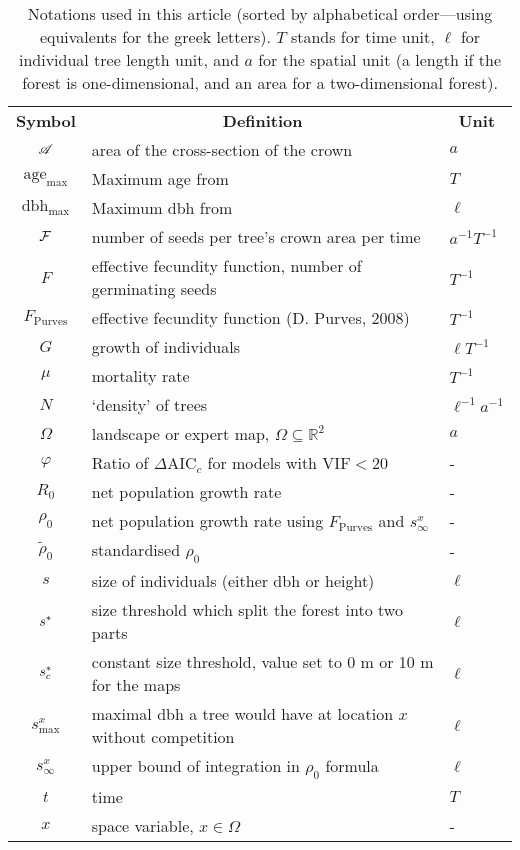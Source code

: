 \begin{table}[h]
	\centering
	\caption{Notations used in this article (sorted by alphabetical order---using equivalents for the greek letters). $ T $ stands for time unit, $ \ell $ for individual tree length unit, and $ a $ for the spatial unit (a length if the forest is one-dimensional, and an area for a two-dimensional forest).} \label{tab::notations}
	\begin{tabular}{@{}cll@{}}
		\toprule
		\textbf{Symbol} & \multicolumn{1}{c}{\textbf{Definition}} & \multicolumn{1}{c}{\textbf{Unit}} \\
		$ \mathscr{A} $ & area of the cross-section of the crown &  $ a $ \\
		$ \text{age}_{\max} $ & Maximum age from \citet{Burns1990, Burns1990a} & $ T $ \\
		$ \text{dbh}_{\max} $ & Maximum dbh from \citet{Burns1990, Burns1990a} & $ \ell $ \\
		$ \mathcal{F} $ & number of seeds per tree's crown area per time & $ a^{-1} T^{-1} $ \\
		$ F $ & effective fecundity function, \ie number of germinating seeds & $ T^{-1} $ \\
		$ F_{\text{Purves}} $ & effective fecundity function (D. Purves, 2008) & $ T^{-1} $ \\
		$ G $ & growth of individuals & $ \ell T^{-1} $ \\
		$ \mu $ & mortality rate & $ T^{-1} $ \\
		$ N $ & `density' of trees & $ \ell^{-1} a^{-1} $ \\
		$ \Omega $ & landscape or expert map, $ \Omega \subseteq \mathds{R}^2 $ & $ a $ \\
		$ \varphi $ & Ratio of $ \Delta \text{AIC}_c $ for models with $ \text{VIF} < 20 $ & - \\
		$ R_0 $ & net population growth rate & - \\
		$ \rho_0 $ & net population growth rate using $ F_{\text{Purves}} $ and $ s_{\infty}^{x} $ & - \\
		$ \tilde \rho_0 $ & standardised $ \rho_0 $ & - \\
		$ s $ & size of individuals (either dbh or height) & $ \ell $ \\
		$ {s}^{*} $ & size threshold which split the forest into two parts & $ \ell $ \\
		$ {s}^{*}_c $ & constant size threshold, value set to 0 m or 10 m for the maps & $ \ell $ \\
		$ s_{\max}^{x} $ & maximal dbh a tree would have at location $ x $ without competition & $ \ell $ \\
		$ s_{\infty}^{x} $ & upper bound of integration in $ \rho_0 $ formula & $ \ell $ \\
		$ t $ & time & $ T $ \\
		$ x $ & space variable, $ x \in \Omega $ & - \\
		\bottomrule
	\end{tabular}
\end{table}

